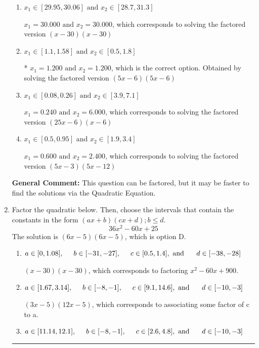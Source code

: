 \documentclass{extbook}[14pt]
\newcommand{\litem}[1]{\item #1

\rule{\textwidth}{0.4pt}}
\begin{document}
\begin{enumerate}
{\begin{enumerate}[label=\Alph*.]
$x_1 = 0.400 \text{ and } x_2 = 3.600$, which corresponds to solving the factored version $(5x -2)(5x -18)$
\item \( x_1 \in [29.95, 30.06] \text{ and } x_2 \in [28.7, 31.3] \)

$x_1 = 30.000 \text{ and } x_2 = 30.000$, which corresponds to solving the factored version $(x -30)(x -30)$
\item \( x_1 \in [1.1, 1.58] \text{ and } x_2 \in [0.5, 1.8] \)

* $x_1 = 1.200 \text{ and } x_2 = 1.200$, which is the correct option. Obtained by solving the factored version $(5x -6)(5x -6)$
\item \( x_1 \in [0.08, 0.26] \text{ and } x_2 \in [3.9, 7.1] \)

$x_1 = 0.240 \text{ and } x_2 = 6.000$, which corresponds to solving the factored version $(25x -6)(x -6)$
\item \( x_1 \in [0.5, 0.95] \text{ and } x_2 \in [1.9, 3.4] \)

$x_1 = 0.600 \text{ and } x_2 = 2.400$, which corresponds to solving the factored version $(5x -3)(5x -12)$
\end{enumerate}

\textbf{General Comment:} This question can be factored, but it may be faster to find the solutions via the Quadratic Equation.
}
\litem{
Factor the quadratic below. Then, choose the intervals that contain the constants in the form $(ax+b)(cx+d); b \leq d.$
\[ 36x^{2} -60 x + 25 \]The solution is \( (6x -5)(6x -5) \), which is option D.\begin{enumerate}[label=\Alph*.]
\item \( a \in [0, 1.08], \hspace*{5mm} b \in [-31, -27], \hspace*{5mm} c \in [0.5, 1.4], \text{ and } \hspace*{5mm} d \in [-38, -28] \)

 $(x -30)(x -30)$, which corresponds to factoring $x^{2} -60 x + 900$.
\item \( a \in [1.67, 3.14], \hspace*{5mm} b \in [-8, -1], \hspace*{5mm} c \in [9.1, 14.6], \text{ and } \hspace*{5mm} d \in [-10, -3] \)

 $(3x -5)(12x -5)$, which corresponds to associating some factor of c to a.
\item \( a \in [11.14, 12.1], \hspace*{5mm} b \in [-8, -1], \hspace*{5mm} c \in [2.6, 4.8], \text{ and } \hspace*{5mm} d \in [-10, -3] \)


\end{enumerate}}
\end{enumerate}
\end{document}
